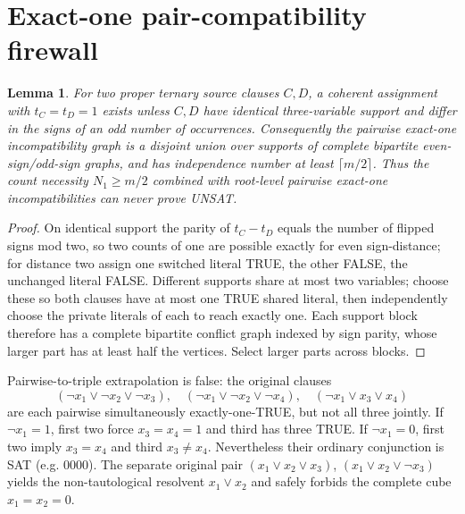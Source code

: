 \documentclass[10pt]{article}
\newtheorem{lemma}{Lemma}
\begin{document}
\section{Exact-one pair-compatibility firewall}
\begin{lemma}
For two proper ternary source clauses $C,D$, a coherent assignment with $t_C=t_D=1$ exists unless $C,D$ have identical three-variable support and differ in the signs of an odd number of occurrences. Consequently the pairwise exact-one incompatibility graph is a disjoint union over supports of complete bipartite even-sign/odd-sign graphs, and has independence number at least $\lceil m/2\rceil$. Thus the count necessity $N_1\ge m/2$ combined with root-level \emph{pairwise} exact-one incompatibilities can never prove UNSAT.
\end{lemma}
\begin{proof}
On identical support the parity of $t_C-t_D$ equals the number of flipped signs mod two, so two counts of one are possible exactly for even sign-distance; for distance two assign one switched literal TRUE, the other FALSE, the unchanged literal FALSE. Different supports share at most two variables; choose these so both clauses have at most one TRUE shared literal, then independently choose the private literals of each to reach exactly one. Each support block therefore has a complete bipartite conflict graph indexed by sign parity, whose larger part has at least half the vertices. Select larger parts across blocks.
\end{proof}
Pairwise-to-triple extrapolation is false: the original clauses
\[
(\neg x_1\vee\neg x_2\vee\neg x_3),\quad
(\neg x_1\vee\neg x_2\vee\neg x_4),\quad
(\neg x_1\vee x_3\vee x_4)
\]
are each pairwise simultaneously exactly-one-TRUE, but not all three jointly. If $\neg x_1=1$, first two force $x_3=x_4=1$ and third has three TRUE. If $\neg x_1=0$, first two imply $x_3=x_4$ and third $x_3\ne x_4$. Nevertheless their ordinary conjunction is SAT (e.g. $0000$). The separate original pair $(x_1\vee x_2\vee x_3)$, $(x_1\vee x_2\vee\neg x_3)$ yields the non-tautological resolvent $x_1\vee x_2$ and safely forbids the complete cube $x_1=x_2=0$.
\end{document}
